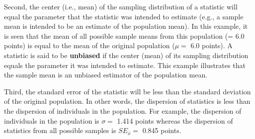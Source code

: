 \documentclass[10pt,openany]{book}\usepackage[]{graphicx}\usepackage[]{color}
\begin{document}
Second, the center (i.e., mean) of the sampling distribution of a statistic will equal the parameter that the statistic was intended to estimate (e.g., a sample mean is intended to be an estimate of the population mean). In this example, it is seen that the mean of all possible sample means from this population (= 6.0 points) is equal to the mean of the original population ($\mu=$ 6.0 points).  A statistic is said to be \textbf{unbiased} if the center (mean) of its sampling distribution equals the parameter it was intended to estimate.  This example illustrates that the sample mean is an unbiased estimator of the population mean.


\vspace{-12pt}

Third, the standard error of the statistic will be less than the standard deviation of the original population.  In other words, the dispersion of statistics is less than the dispersion of individuals in the population.  For example, the dispersion of individuals in the population is $\sigma=$ 1.414 points whereas the dispersion of statistics from all possible samples is $SE_{\bar{x}}=$ 0.845 points.


\vspace{-12pt}

\vspace{-12pt}
\end{document}

